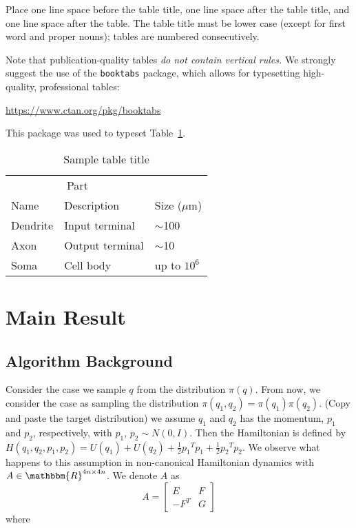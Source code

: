 \documentclass{article}
\begin{document}
Place one line space before the table title, one line space after the
table title, and one line space after the table. The table title must
be lower case (except for first word and proper nouns); tables are
numbered consecutively.

Note that publication-quality tables \emph{do not contain vertical rules.} We
strongly suggest the use of the \verb+booktabs+ package, which allows for
typesetting high-quality, professional tables:
\begin{center}
  \url{https://www.ctan.org/pkg/booktabs}
\end{center}
This package was used to typeset Table~\ref{sample-table}.

\begin{table}
  \caption{Sample table title}
  \label{sample-table}
  \centering
  \begin{tabular}{lll}
    \toprule
    \multicolumn{2}{c}{Part}                   \\
    \cmidrule(r){1-2}
    Name     & Description     & Size ($\mu$m) \\
    \midrule
    Dendrite & Input terminal  & $\sim$100     \\
    Axon     & Output terminal & $\sim$10      \\
    Soma     & Cell body       & up to $10^6$  \\
    \bottomrule
  \end{tabular}
\end{table}

\section{Main Result}
\subsection{Algorithm Background}

Consider the case we sample $q$ from the distribution $\pi(q)$. From now, we consider the case as sampling the distribution $\pi(q_1 , q_2 ) = \pi(q_1)\pi (q_2)$. (Copy and paste the target distribution) we assume $q_1$ and $q_2$ has the momentum, $p_1$ and $p_2$, respectively, with $p_1$, $p_2 \sim N(0,I)$. Then the Hamiltonian is defined by $\displaystyle H(q_1, q_2, p_1, p_2)  = U(q_1) +U(q_2)+\frac{1}{2}{p_1}^T p_1 + \frac{1}{2}{p_2}^T p_2$. We observe what happens to this assumption in non-canonical Hamiltonian dynamics with $A \in \mathbbm{R}^{4n \times 4n} $. We denote $A$ as
\[
A=
\left[
\begin{array}{c|c}
E & F \\
\hline
-F^{T} & G
\end{array}
\right]
\] where
\end{document}
